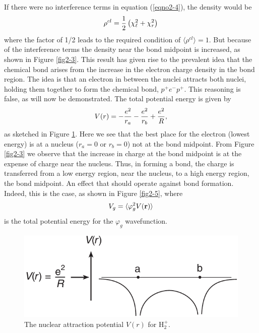 If there were no interference terms in equation (\ref{eqno2-4}), the
density would be
\begin{equation}
\rho^{cl} = {1 \over 2} \left( \chi^2_{\ell} + \chi_r^2 \right)
\end{equation}
where the factor of 1/2 leads to the required condition of $\langle
\rho^{cl} \rangle = 1$.  But because of the interference terms the
density near the bond midpoint is increased, as shown in Figure
\ref{fig2-3}. This result has given rise to the prevalent idea that
the chemical bond arises from the increase in the electron charge
density in the bond region. The idea is that an electron in between
the nuclei attracts both nuclei, holding them together to form the
chemical bond, $p^+e^-p^+$. This reasoning is false, as will now be
demonstrated.  The total potential energy is given by
\begin{equation}
V(r) = - {e^2 \over r_a} - {e^2 \over r_b} + {e^2 \over R},
\end{equation}
as sketched in Figure \ref{fig2-4}.  Here we see that the best place
for the electron (lowest energy) is at a nucleus ($r_a = 0$ or $r_b =
0$) not at the bond midpoint. From Figure \ref{fig2-3} we observe that
the increase in charge at the bond midpoint is at the expense of
charge near the nucleus. Thus, in forming a bond, the charge is
transferred from a low energy region, near the nucleus, to a high
energy region, the bond midpoint. An effect that should operate
against bond formation. Indeed, this is the case, as shown in Figure
\ref{fig2-5}, where
\begin{equation}
V_g = \langle \varphi^2_g V ( {\bf r} ) \rangle
\end{equation}
is the total potential energy for the $\varphi_g$ wavefunction.

\begin{figure}
\includegraphics[scale=0.75]{fig2-04}
\caption{The nuclear attraction potential $V(r)$ for H$_2^+$.}
\label{fig2-4}
\end{figure}


